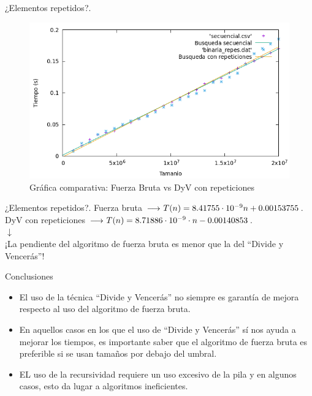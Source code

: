 \documentclass[10pt, xcolor=table]{beamer}
\begin{document}
\begin{frame}[fragile]{¿Elementos repetidos?. }
	\begin{figure}[h!]
		\centering
		\includegraphics[scale=0.45]{./Images/Grafica_secvsrep.png}
		\caption{Gráfica comparativa: Fuerza Bruta vs DyV con repeticiones}
	\end{figure}
\end{frame}

\begin{frame}[fragile]{¿Elementos repetidos?. }
	\centering Fuerza bruta \(\longrightarrow$ \( T(n) = 8.41755 \cdot 10^{-9} n + 0.00153755\).\\
	
	\centering DyV con repeticiones \(\longrightarrow$ \( T(n) = 8.71886 \cdot 10^{-9} \cdot n -0.00140853 \).\\
	
	\centering $\downarrow$ \\
	
	\centering ¡La pendiente del algoritmo de fuerza bruta es menor que la del ``Divide y Vencerás''!
\end{frame}

\begin{frame}{Conclusiones}

	\begin{itemize}
	\item El uso de la técnica ``Divide y Vencerás'' no siempre es garantía de mejora respecto al uso del algoritmo de fuerza bruta.
	
	\item En aquellos casos en los que el uso de ``Divide y Vencerás'' sí nos ayuda a mejorar los tiempos, es importante saber que el algoritmo de fuerza bruta es preferible si se usan tamaños por debajo del umbral.
	
	\item EL uso de la recursividad requiere un uso excesivo de la pila y en algunos casos, esto da lugar a algoritmos ineficientes.
	
		
\end{itemize}		
\end{frame}
\end{document}
